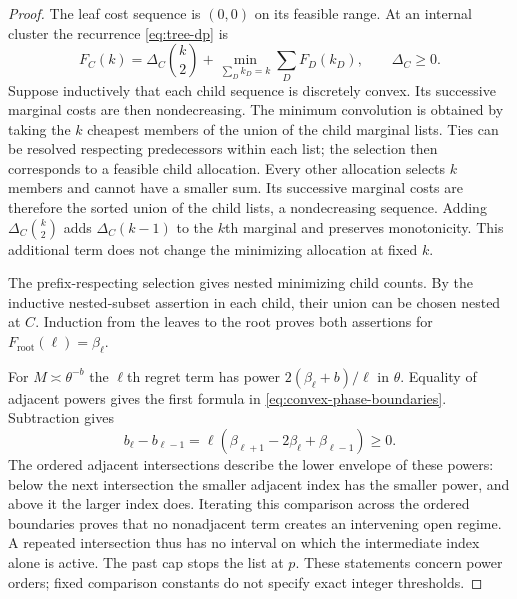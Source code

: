\begin{proof}
The leaf cost sequence is $(0,0)$ on its feasible range. At an internal
cluster the recurrence \eqref{eq:tree-dp} is
\[
 F_C(k)=\Delta_C\binom{k}{2}
       +\min_{\sum_Dk_D=k}\sum_DF_D(k_D),\qquad\Delta_C\ge0.
\]
Suppose inductively that each child sequence is discretely convex.
Its successive marginal costs are then nondecreasing. The minimum
convolution is obtained by taking the $k$ cheapest members of the union
of the child marginal lists. Ties can be resolved respecting predecessors
within each list; the selection then corresponds to a feasible child
allocation. Every other allocation selects $k$ members and cannot have
a smaller sum. Its successive marginal costs are therefore the sorted
union of the child lists, a nondecreasing sequence. Adding
$\Delta_C\binom{k}{2}$ adds $\Delta_C(k-1)$ to the $k$th marginal
and preserves monotonicity. This additional term does not change the
minimizing allocation at fixed $k$.

The prefix-respecting selection gives nested minimizing child counts.
By the inductive nested-subset assertion in each child, their union
can be chosen nested at $C$. Induction from the leaves to the root proves
both assertions for $F_{\mathrm{root}}(\ell)=\beta_\ell$.

For $M\asymp\theta^{-b}$ the $\ell$th regret term has power
$2(\beta_\ell+b)/\ell$ in $\theta$. Equality of adjacent powers
gives the first formula in \eqref{eq:convex-phase-boundaries}.
Subtraction gives
\[
 b_\ell-b_{\ell-1}
   =\ell(\beta_{\ell+1}-2\beta_\ell+\beta_{\ell-1})\ge0.
\]
The ordered adjacent intersections describe the lower envelope of these
powers: below the next intersection the smaller adjacent index has the
smaller power, and above it the larger index does. Iterating this
comparison across the ordered boundaries proves that no nonadjacent
term creates an intervening open regime. A repeated intersection thus
has no interval on which the intermediate index alone is active.
The past cap stops the list at $p$. These statements concern power
orders; fixed comparison constants do not specify exact integer
thresholds.
\end{proof}
